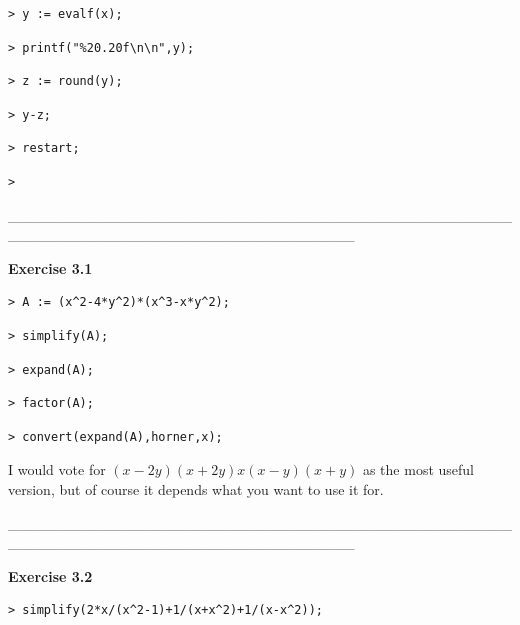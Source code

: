\documentclass{article}
\begin{document}
\begin{lstlisting}
> y := evalf(x);
\end{lstlisting}
\begin{lstlisting}
> printf("%20.20f\n\n",y);
\end{lstlisting}
\begin{lstlisting}
> z := round(y);
\end{lstlisting}
\begin{lstlisting}
> y-z;
\end{lstlisting}
\begin{lstlisting}
> restart;
\end{lstlisting}
\begin{lstlisting}
> 
\end{lstlisting}
\begin{Maple Normal}
\_\_\_\_\_\_\_\_\_\_\_\_\_\_\_\_\_\_\_\_\_\_\_\_\_\_\_\_\_\_\_\_\_\_\_\_\_\_\_\_\_\_\_\_\_\_\_\_\_\_\_\_\_\_\_\_\_\_\_\_\_\_\_\_\_\_\_\_\_\_\_\_\_\_\_\_\_\_\_\_\_
\end{Maple Normal}
\begin{Maple Heading 2}
\textbf{Exercise 3.1}
\end{Maple Heading 2}
\begin{lstlisting}
> A := (x^2-4*y^2)*(x^3-x*y^2);
\end{lstlisting}
\begin{lstlisting}
> simplify(A);
\end{lstlisting}
\begin{lstlisting}
> expand(A);
\end{lstlisting}
\begin{lstlisting}
> factor(A);
\end{lstlisting}
\begin{lstlisting}
> convert(expand(A),horner,x);
\end{lstlisting}
\begin{Maple Normal}
I would vote for 
$ (x -2 y) (x +2 y) x (x -y) (x +y) $ as the most useful version, but of course it depends what you want to use it for.
\end{Maple Normal}
\begin{Maple Normal}
\_\_\_\_\_\_\_\_\_\_\_\_\_\_\_\_\_\_\_\_\_\_\_\_\_\_\_\_\_\_\_\_\_\_\_\_\_\_\_\_\_\_\_\_\_\_\_\_\_\_\_\_\_\_\_\_\_\_\_\_\_\_\_\_\_\_\_\_\_\_\_\_\_\_\_\_\_\_\_\_\_
\end{Maple Normal}
\begin{Maple Heading 2}
\textbf{Exercise 3.2}
\end{Maple Heading 2}
\begin{lstlisting}
> simplify(2*x/(x^2-1)+1/(x+x^2)+1/(x-x^2));
\end{lstlisting}
\end{document}
